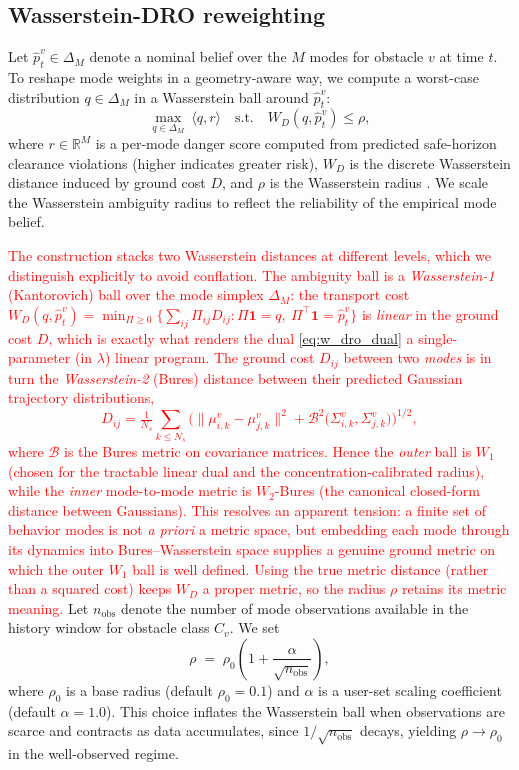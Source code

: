 \documentclass[letterpaper,10pt,conference]{ieeeconf}
\newcommand{\chg}[1]{\textcolor{red}{#1}}
\begin{document}
\subsection{Wasserstein-DRO reweighting} \label{sec:wass_prelim}

Let $\widehat p_t^v\in\Delta_M$ denote a nominal belief over the $M$ modes for obstacle $v$ at time $t$.
To reshape mode weights in a geometry-aware way, we compute a worst-case distribution $q\in\Delta_M$ in a Wasserstein ball around $\widehat p_t^v$:
\begin{equation}\label{eq:w_dro_modes}
\max_{q\in\Delta_M}\ \langle q,r\rangle
\quad\text{s.t.}\quad
W_D(q,\widehat p_t^v)\le \rho,
\end{equation}
where $r\in\mathbb{R}^M$ is a per-mode danger score computed from predicted safe-horizon clearance violations (higher indicates greater risk), $W_D$ is the discrete Wasserstein distance induced by ground cost $D$, and $\rho$ is the Wasserstein radius \cite{Esfahani2017DDRDRO,Zhong2021DDRMPC,kuhn2024WDRO}. We scale the Wasserstein ambiguity radius to reflect the reliability of the empirical mode belief.

\chg{The construction stacks two Wasserstein distances at different levels, which we distinguish explicitly to avoid conflation. The ambiguity ball is a \emph{Wasserstein-1} (Kantorovich) ball over the mode simplex $\Delta_M$: the transport cost $W_D(q,\widehat p_t^v)=\min_{\Pi\ge 0}\{\sum_{ij}\Pi_{ij}D_{ij} : \Pi\mathbf 1=q,\ \Pi^{\!\top}\mathbf 1=\widehat p_t^v\}$ is \emph{linear} in the ground cost $D$, which is exactly what renders the dual \eqref{eq:w_dro_dual} a single-parameter (in $\lambda$) linear program. The ground cost $D_{ij}$ between two \emph{modes} is in turn the \emph{Wasserstein-2} (Bures) distance between their predicted Gaussian trajectory distributions,
\[
D_{ij}=\tfrac{1}{N_s}\sum_{k\le N_s}\!\Big(\|\mu_{i,k}^v-\mu_{j,k}^v\|^2+\mathcal B^2\!\big(\Sigma_{i,k}^v,\Sigma_{j,k}^v\big)\Big)^{1/2},
\]
where $\mathcal B$ is the Bures metric on covariance matrices. Hence the \emph{outer} ball is $W_1$ (chosen for the tractable linear dual and the concentration-calibrated radius), while the \emph{inner} mode-to-mode metric is $W_2$-Bures (the canonical closed-form distance between Gaussians). This resolves an apparent tension: a finite set of behavior modes is not \emph{a priori} a metric space, but embedding each mode through its dynamics into Bures--Wasserstein space supplies a genuine ground metric on which the outer $W_1$ ball is well defined. Using the true metric distance (rather than a squared cost) keeps $W_D$ a proper metric, so the radius $\rho$ retains its metric meaning.}
Let $n_{\mathrm{obs}}$ denote the number of mode observations available in the history window for obstacle class $C_v$.
We set
\[
\rho \;=\; \rho_0\!\left(1+\frac{\alpha}{\sqrt{n_{\mathrm{obs}}}}\right),
\]
where $\rho_0$ is a base radius (default $\rho_0=0.1$) and $\alpha$ is a user-set scaling coefficient (default $\alpha=1.0$).
This choice inflates the Wasserstein ball when observations are scarce and contracts as data accumulates, since $1/\sqrt{n_{\mathrm{obs}}}$ decays, yielding $\rho\to\rho_0$ in the well-observed regime.
\end{document}
